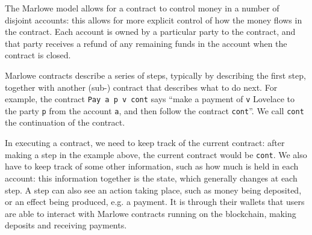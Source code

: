 \documentclass[runningheads]{llncs}
\begin{document}
The Marlowe model allows for a contract to control money in a number of disjoint accounts: this allows for more explicit control of how the money flows in the contract. Each account is owned by a particular party to the contract, and that party receives a refund of any remaining funds in the account when the contract is closed. %

Marlowe contracts describe a series of steps, typically by describing the first step, together with another (sub-) contract that describes what to do next. For example, the contract \texttt{Pay a p v cont} says ``make a payment of \texttt{v} Lovelace to the party \texttt{p} from the account \texttt{a}, and then follow the contract \texttt{cont}''. We call \texttt{cont} the continuation of the contract.

In executing a contract, we need to keep track of the current contract: after making a step in the example above, the current contract would be \texttt{cont}. We also have to keep track of some other information, such as how much is held in each account: this information together is the state, which generally changes at each step. A step can also see an action taking place, such as money being deposited, or an effect being produced, e.g. a payment.
It is through their wallets that users are able to interact with Marlowe contracts running on the blockchain, making deposits and receiving payments. %

\end{document}
